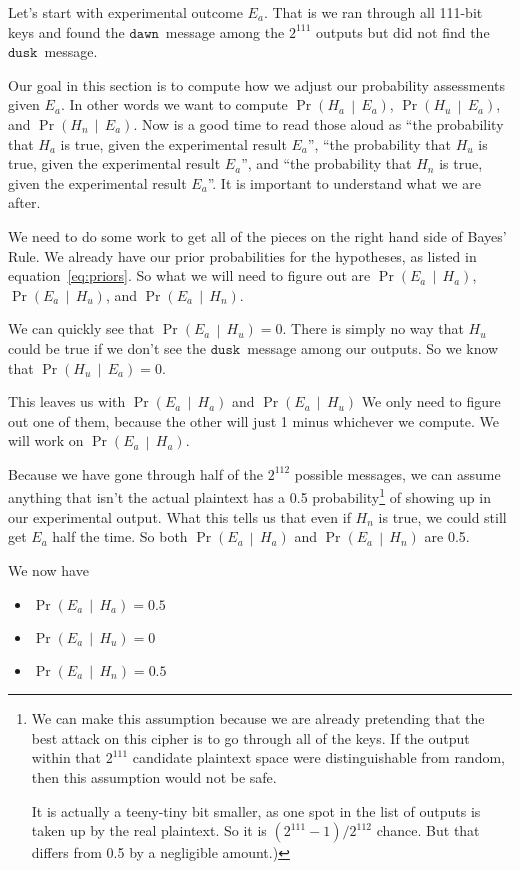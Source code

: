 \documentclass[11pt]{article}
\newcommand{\prob}[1]{\ensuremath{\operatorname{Pr}\left( #1 \right)}}
\newcommand{\condprob}[2]{\prob{#1\, \middle|\, #2}}
\newcommand\mdusk{\ensuremath{\mathtt{dusk}}}
\newcommand\mdawn{\ensuremath{\mathtt{dawn}}}
\begin{document}
Let's start with experimental outcome $E_a$. That is we ran through all 111-bit keys and found the \mdawn\ message among the $2^{111}$ outputs but did not find the \mdusk\ message.

Our goal in this section is to compute how we adjust our probability assessments given $E_a$.
In other words we want to compute \condprob{H_a}{E_a}, \condprob{H_u}{E_a},
and \condprob{H_n}{E_a}. Now is a good time to read those aloud as
\enquote{the probability that $H_a$ is true, given the experimental result $E_a$},
\enquote{the probability that $H_u$ is true, given the experimental result $E_a$},
and  \enquote{the probability that $H_n$ is true, given the experimental result $E_a$}. It is important to understand what we are after.


We need to do some work to get all of the pieces on the right hand side of Bayes' Rule. We already have our prior probabilities for the hypotheses,
as listed in equation~\ref{eq:priors}. So what we will need to figure out are
\condprob{E_a}{H_a}, \condprob{E_a}{H_u}, and \condprob{E_a}{H_n}.

We can quickly see that $\condprob{E_a}{H_u} = 0$.
There is simply no way that $H_u$ could be true if we don't see the \mdusk\ message among our outputs. So we know that $\condprob{H_u}{E_a} = 0$.

This leaves us with \condprob{E_a}{H_a} and \condprob{E_a}{H_u}
We only need to figure out one of them, because the other will just 1 minus whichever we compute. We will work on \condprob{E_a}{H_a}.

Because we have gone through half of the $2^{112}$ possible messages,
we can assume
anything that isn't the actual plaintext has a 0.5 probability\footnote{%
    We can make this assumption because we are already pretending that the best attack on this cipher is to go through all of the keys.
    If the output within that $2^{111}$ candidate plaintext space were distinguishable from random, then this assumption would not be safe.

    It is actually a teeny-tiny bit smaller, as one spot in the list of outputs
    is taken up by the real plaintext. So it is $(2^{111}-1)/2^{112}$ chance.
    But that differs from 0.5 by a negligible amount.)
}
of showing up in our experimental output.
What this tells us that even if $H_n$ is true, we could still get $E_a$ half the time.
So both \condprob{E_a}{H_a} and \condprob{E_a}{H_n} are 0.5.

We now have 
\begin{itemize}
    \item $\condprob{E_a}{H_a} = 0.5$
    \item $\condprob{E_a}{H_u} = 0$
    \item $\condprob{E_a}{H_n} = 0.5$
\end{itemize}
\end{document}
